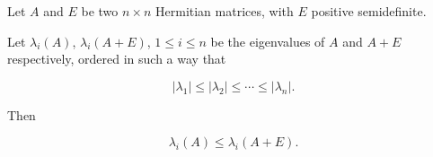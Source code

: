 \documentclass[12pt]{article}
\begin{document}
Let $A$ and $E$ be two $n \times n$ Hermitian matrices, with $E$ positive semidefinite.

Let $\lambda_i(A)$, $\lambda_i(A+E)$, $1\leq i\leq n$ be the eigenvalues of $A$ and $A+E$ respectively, ordered in such a way that

\[
|\lambda_1|\leq |\lambda_2|\leq \cdots \leq |\lambda_n|.
\]

Then

\[
\lambda_i(A)\leq \lambda_i(A+E).
\]
\end{document}
